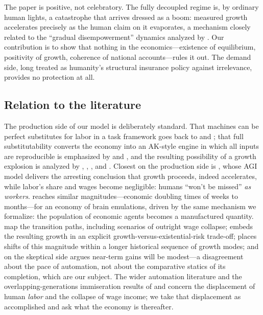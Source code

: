 \documentclass[11pt]{article}
\begin{document}
The paper is positive, not celebratory. The fully decoupled regime is, by ordinary human lights, a catastrophe that arrives dressed as a boom: measured growth accelerates precisely as the human claim on it evaporates, a mechanism closely related to the ``gradual disempowerment'' dynamics analyzed by \citet{kulveit2025}. Our contribution is to show that nothing in the economics---existence of equilibrium, positivity of growth, coherence of national accounts---rules it out. The demand side, long treated as humanity's structural insurance policy against irrelevance, provides no protection at all.

\subsection{Relation to the literature}\label{sec:lit}

The production side of our model is deliberately standard. That machines can be perfect substitutes for labor in a task framework goes back to \citet{zeira1998} and \citet{acemoglu2018}; that full substitutability converts the economy into an AK-style engine in which all inputs are reproducible is emphasized by \citet{aghion2019} and \citet{korinek2024}, and the resulting possibility of a growth explosion is analyzed by \citet{nordhaus2021}, \citet{trammell2023}, \citet{davidson2023}, and \citet{erdil2023}. Closest on the production side is \citet{restrepo2025}, whose AGI model delivers the arresting conclusion that growth proceeds, indeed accelerates, while labor's share and wages become negligible: humans ``won't be missed'' \emph{as workers}. \citet{hanson2016} reaches similar magnitudes---economic doubling times of weeks to months---for an economy of brain emulations, driven by the same mechanism we formalize: the population of economic agents becomes a manufactured quantity. \citet{korineksuh2024} map the transition paths, including scenarios of outright wage collapse; \citet{jones2024} embeds the resulting growth in an explicit growth-versus-existential-risk trade-off; \citet{hanson2000} places shifts of this magnitude within a longer historical sequence of growth modes; and on the skeptical side \citet{acemoglu2024} argues near-term gains will be modest---a disagreement about the pace of automation, not about the comparative statics of its completion, which are our subject. The wider automation literature \citep{brynjolfsson2014,autor2015,ford2015,frey2017,susskind2020} and the overlapping-generations immiseration results of \citet{sachs2012} and \citet{benzell2015} concern the displacement of human \emph{labor} and the collapse of wage income; we take that displacement as accomplished and ask what the economy is thereafter.
\end{document}

